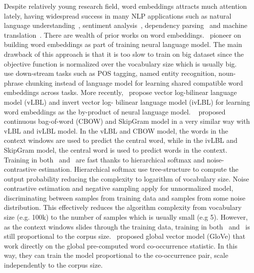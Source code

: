 \documentclass[12pt,twoside,final,hidelinks]{ltthesis}
\theoremstyle{definition}
\begin{document}
Despite relatively young research field, word embeddings attracts much attention lately, having 
widespread success in many NLP applications such as natural language 
understanding~\cite{Collobert:2008}, sentiment analysis~\cite{socher-EtAl:2013:EMNLP},
dependency parsing~\cite{dyer-EtAl:2015:ACL-IJCNLP} and machine 
translation~\cite{DBLP:journals/corr/BahdanauCB14}. 
There are wealth of prior works on word embeddings.~ 
pioneer on building word embeddings as part of training neural language model. The main drawback of 
this approach is that it is too slow to train on big dataset since the objective function is 
normalized over the vocabulary size which is usually big.~ use down-stream 
tasks such as POS tagging, named entity recognition, noun-phrase chunking instead of language model 
for learning shared compatible word embeddings across tasks. 
More recently,~ propose vector log-bilinear language model (vLBL) and invert vector log-
bilinear language model (ivLBL) for learning word embeddings as the by-product of neural language model.
~ proposed continuous bag-of-word (CBOW) 
and SkipGram model in a very similar way with vLBL and ivLBL model. In the vLBL and CBOW 
model, the words in the context windows are used to predict the central word, while in the ivLBL and SkipGram 
 model, the central word is used to predict words in the context. 
Training in both~ and~ are fast 
thanks to hierarchical softmax and noise-contrastive estimation. Hierarchical softmax use tree-structure 
to compute the output probability reducing the complexity to logarithm of vocabulary 
size. Noise contrastive estimation and negative sampling apply for unnormalized model, 
discriminating between samples from training data and samples from some noise distribution. 
This effectively reduces the algorithm complexity from vocabulary size (e.g. 100k) to the number of samples which is usually small (e.g 5). 
However, as the context windows slides through 
the training data, training in both~ 
and~ is still proportional to the corpus 
size.~ proposed global vector model (GloVe) that work directly on the 
global pre-computed word co-occurrence statistic. In this way, they can train the model 
proportional to the co-occurrence pair, scale independently to the corpus size. 
\end{document}
